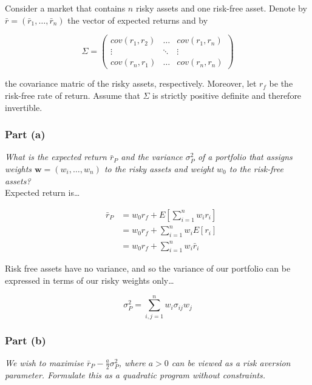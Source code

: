 \documentclass[11pt]{article}
\begin{document}
Consider a market that contains $n$ risky assets and one risk-free asset. Denote by
$\bar{r}=\left(\bar{r}_{1},\dots,\bar{r}_{n}\right)$ the vector of expected returns and by

\begin{equation*}
\Sigma = \begin{pmatrix}
  cov(r_{1},r_{2}) & \dots  & cov(r_{1},r_{n}) \\
  \vdots           & \ddots & \vdots \\
  cov(r_{n},r_{1}) & \dots  & cov(r_{n},r_{n})
\end{pmatrix}
\end{equation*}

the covariance matric of the risky assets, respectively. Moreover, let $r_{f}$ be the risk-free
rate of return. Assume that $\Sigma$ is strictly positive definite and therefore invertible.

\subsubsection*{Part (a)}

\textit{What is the expected return $\bar{r}_{P}$ and the variance $\sigma^{2}_{P}$ of a
  portfolio that assigns weights $\textbf{w} = (w_{i},\dots,w_{n})$ to the risky assets and
weight $w_{0}$ to the risk-free assets?} \\

Expected return is\dots

\setcounter{equation}{0}
\begin{eqnarray}
  & \bar{r}_{P} &= w_{0}r_{f} + E\left[\sum_{i=1}^{n} w_{i}r_{i}\right] \\
  &&= w_{0}r_{f} + \sum_{i=1}^{n} w_{i} E\left[r_{i}\right] \\
  &&= w_{0}r_{f} + \sum_{i=1}^{n} w_{i} \bar{r}_{i}
\end{eqnarray}

Risk free assets have no variance, and so the variance of our portfolio can be expressed
in terms of our risky weights only\dots

\[ \sigma^{2}_{P} = \sum_{i,j=1}^{n} w_{i}\sigma_{ij}w_{j} \]

\subsubsection*{Part (b)}

\textit{We wish to maximise $\bar{r}_{P} - \frac{a}{2}\sigma^{2}_{P}$, where $a
> 0$ can be viewed as a risk aversion parameter. Formulate this as a quadratic
program without constraints.} \\
\end{document}
